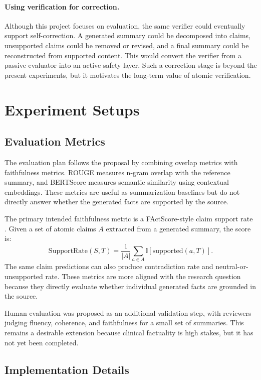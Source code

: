 \documentclass[11pt]{article}
\begin{document}
\paragraph{Using verification for correction.}
Although this project focuses on evaluation, the same verifier could eventually support self-correction. A generated summary could be decomposed into claims, unsupported claims could be removed or revised, and a final summary could be reconstructed from supported content. This would convert the verifier from a passive evaluator into an active safety layer. Such a correction stage is beyond the present experiments, but it motivates the long-term value of atomic verification.

\section{Experiment Setups}

\subsection{Evaluation Metrics}

The evaluation plan follows the proposal by combining overlap metrics with faithfulness metrics. ROUGE \cite{lin2004rouge} measures n-gram overlap with the reference summary, and BERTScore \cite{zhang2020bertscore} measures semantic similarity using contextual embeddings. These metrics are useful as summarization baselines but do not directly answer whether the generated facts are supported by the source.

The primary intended faithfulness metric is a FActScore-style claim support rate \cite{min2023factscore}. Given a set of atomic claims $A$ extracted from a generated summary, the score is:
\[
\mathrm{SupportRate}(S,T) = \frac{1}{|A|}\sum_{a \in A}\mathbb{I}[\mathrm{supported}(a,T)].
\]
The same claim predictions can also produce contradiction rate and neutral-or-unsupported rate. These metrics are more aligned with the research question because they directly evaluate whether individual generated facts are grounded in the source.

Human evaluation was proposed as an additional validation step, with reviewers judging fluency, coherence, and faithfulness for a small set of summaries. This remains a desirable extension because clinical factuality is high stakes, but it has not yet been completed.

\subsection{Implementation Details}
\end{document}
